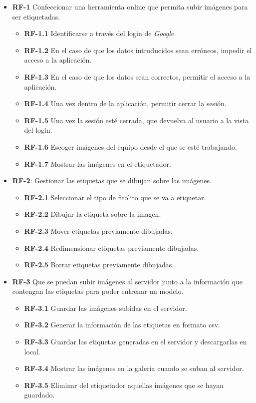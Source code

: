 \begin{itemize}
	\item \textbf{RF-1} Confeccionar una herramienta online que permita subir imágenes para ser etiquetadas.
	\begin{itemize}
		\item \textbf{RF-1.1}  Identificarse a través del login de \textit{Google}
		 	\item \textbf{RF-1.2} En el caso de que los datos introducidos sean erróneos, impedir el acceso a la aplicación. 
		 \item \textbf{RF-1.3} En el caso de que los datos sean correctos, permitir el acceso a la aplicación. 
		 \item \textbf{RF-1.4} Una vez dentro de la aplicación, permitir cerrar la sesión.
		 \item \textbf{RF-1.5} Una vez la sesión esté cerrada, que devuelva al usuario a la vista del login.
		\item \textbf{RF-1.6} Escoger imágenes del equipo desde el que se esté trabajando.
		\item \textbf{RF-1.7} Mostrar las imágenes en el etiquetador.
	\end{itemize}
	\item \textbf{RF-2}: Gestionar las etiquetas que se dibujan sobre las imágenes.
	\begin{itemize}
		\item \textbf{RF-2.1} Seleccionar el tipo de fitolito que se va a etiquetar.
		\item \textbf{RF-2.2} Dibujar la etiqueta sobre la imagen.
		\item \textbf{RF-2.3} Mover etiquetas previamente dibujadas.
		\item \textbf{RF-2.4} Redimensionar etiquetas previamente dibujadas.
		\item \textbf{RF-2.5} Borrar etiquetas previamente dibujadas.
	\end{itemize}
	\item \textbf{RF-3} Que se puedan subir imágenes al servidor junto a la información que contengan las etiquetas para poder entrenar un modelo. 
	\begin{itemize}
		\item \textbf{RF-3.1} Guardar las imágenes subidas en el servidor.
			\item \textbf{RF-3.2} Generar la información de las etiquetas en formato csv.
		\item \textbf{RF-3.3} Guardar las etiquetas generadas en el servidor y descargarlas en local.
		\item \textbf{RF-3.4} Mostrar las imágenes en la galería cuando se suban al servidor.
		\item \textbf{RF-3.5} Eliminar del etiquetador aquellas imágenes que se hayan guardado. 
	\end{itemize}

\end{itemize}
